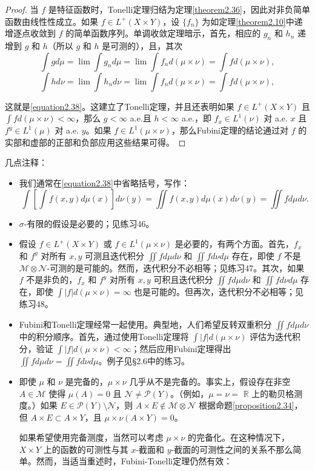 \documentclass[lang=cn,10pt,thmcnt=section]{elegantbook}
\begin{document}
\begin{proof}
当 $f$ 是特征函数时，Tonelli定理归结为定理\ref{theorem2.36}，因此对非负简单函数由线性性成立。如果 $f \in L^+(X \times Y)$，设 $\{f_n\}$ 为如定理\ref{theorem2.10}中递增逐点收敛到 $f$ 的简单函数序列。单调收敛定理暗示，首先，相应的 $g_n$ 和 $h_n$ 递增到 $g$ 和 $h$（所以 $g$ 和 $h$ 是可测的），且，其次
\[ \int g d\mu = \lim \int g_n d\mu = \lim \int f_n d(\mu \times \nu) = \int f d(\mu \times \nu), \]
\[ \int h d\nu = \lim \int h_n d\nu = \lim \int f_n d(\mu \times \nu) = \int f d(\mu \times \nu), \]

这就是\eqref{equation2.38}。这建立了Tonelli定理，并且还表明如果 $f \in L^+(X \times Y)$ 且 $\int f d(\mu \times \nu) < \infty$，那么 $g < \infty$ a.e.且 $h < \infty$ a.e.，即 $f_x \in L^1(\nu)$ 对 a.e. $x$ 且 $f^y \in L^1(\mu)$ 对 a.e. $y$。如果 $f \in L^1(\mu \times \nu)$，那么Fubini定理的结论通过对 $f$ 的实部和虚部的正部和负部应用这些结果可得。
\end{proof}

几点注释：

\begin{itemize}
\item 我们通常在\eqref{equation2.38}中省略括号，写作：
\[ \int \left[ \int f(x, y) d\mu(x) \right] d\nu(y) = \iint f(x, y) d\mu(x) d\nu(y) = \iint f d\mu d\nu. \]

\item $\sigma$-有限的假设是必要的；见练习46。

\item 假设 $f \in L^+(X \times Y)$ 或 $f \in L^1(\mu \times \nu)$ 是必要的，有两个方面。首先，$f_x$ 和 $f^y$ 对所有 $x, y$ 可测且迭代积分 $\iint f d\mu d\nu$ 和 $\iint f d\nu d\mu$ 存在，即使 $f$ 不是 $\mathcal{M} \otimes \mathcal{N}$-可测的是可能的。然而，迭代积分不必相等；见练习47。其次，如果 $f$ 不是非负的，$f_x$ 和 $f^y$ 对所有 $x, y$ 可积且迭代积分 $\iint f d\mu d\nu$ 和 $\iint f d\nu d\mu$ 存在，即使 $\int |f| d(\mu \times \nu) = \infty$ 也是可能的。但再次，迭代积分不必相等；见练习48。

\item Fubini和Tonelli定理经常一起使用。典型地，人们希望反转双重积分 $\iint f d\mu d\nu$ 中的积分顺序。首先，通过使用Tonelli定理将 $\int |f| d(\mu \times \nu)$ 评估为迭代积分，验证 $\int |f| d(\mu \times \nu) < \infty$；然后应用Fubini定理得出 $\iint f d\mu d\nu = \iint f d\nu d\mu$。例子见§2.6中的练习。

\item 即使 $\mu$ 和 $\nu$ 是完备的，$\mu \times \nu$ 几乎从不是完备的。事实上，假设存在非空 $A \in \mathcal{M}$ 使得 $\mu(A) = 0$ 且 $\mathcal{N} \neq \mathcal{P}(Y)$。（例如，$\mu = \nu = $ $\mathbb{R}$ 上的勒贝格测度。）如果 $E \in \mathcal{P}(Y) \setminus \mathcal{N}$，则 $A \times E \notin \mathcal{M} \otimes \mathcal{N}$ 根据命题\ref{proposition2.34}，但 $A \times E \subset A \times Y$，且 $\mu \times \nu(A \times Y) = 0$。

如果希望使用完备测度，当然可以考虑 $\mu \times \nu$ 的完备化。在这种情况下，$X \times Y$ 上的函数的可测性与其 $x$-截面和 $y$-截面的可测性之间的关系不那么简单。然而，当适当重述时，Fubini-Tonelli定理仍然有效：
\end{itemize}
\end{document}
